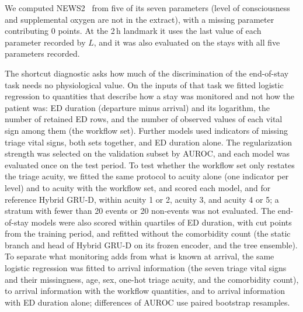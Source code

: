We computed NEWS2~\cite{rcp2017news2} from five of its seven parameters (level of consciousness and supplemental oxygen are not in the
extract), with a missing parameter contributing 0 points. At the 2\,h landmark it uses the last value of each parameter recorded by $L$, and it was also evaluated on the stays with all five parameters recorded.

The shortcut diagnostic asks how much of the discrimination of the end-of-stay task needs no physiological value. On the inputs of that task we fitted logistic
regression to quantities that describe how a stay was monitored and not how the patient was: ED duration (departure minus arrival) and its logarithm, the number of
retained ED rows, and the number of observed values of each vital sign among them (the workflow set). Further models used indicators of missing triage vital signs,
both sets together, and ED duration alone. The regularization strength was selected on the validation subset by AUROC, and each model was evaluated once on the test
period. To test whether the workflow set only restates the triage acuity, we fitted the same protocol to acuity alone (one indicator per level) and to acuity with the
workflow set, and scored each model, and for reference Hybrid GRU-D, within acuity 1 or 2, acuity 3, and acuity 4 or 5; a stratum with fewer than 20 events or 20 non-events was not evaluated. The
end-of-stay models were also scored within quartiles of ED duration, with cut points from the training period, and refitted without the comorbidity count (the static
branch and head of Hybrid GRU-D on its frozen encoder, and the tree ensemble). To separate what monitoring adds from what is known at arrival, the same logistic regression was fitted to arrival information (the seven triage vital signs and their missingness, age, sex, one-hot triage acuity, and the comorbidity count), to arrival information with the workflow quantities, and to arrival information with ED duration alone; differences of AUROC use paired bootstrap resamples.


